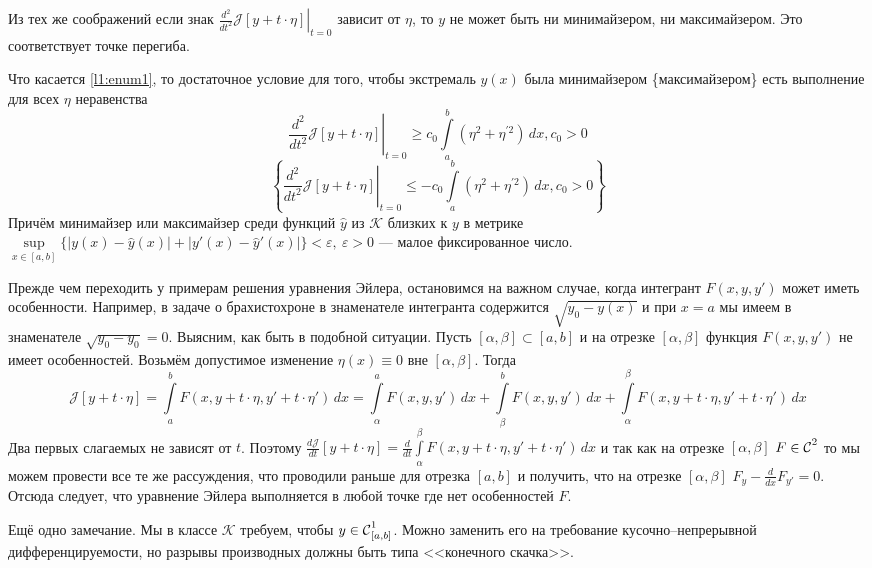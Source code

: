 \documentclass[12pt,a4paper,openany,fleqn]{book}
\newcommand{\Cf}{\ensuremath{\mathcal{C}}}
\newcommand{\J}{\ensuremath{\mathcal{J}}}
\newcommand{\mc}[1]{\ensuremath{\mathcal{#1}}}
\newcommand{\Cfn}[2][]{\ensuremath{\Cf{\mathstrut}^{#2}_{#1}}}
\newcommand{\der}[2]{\ensuremath{\frac{d#1}{d#2}}}
\newcommand{\dder}[2]{\ensuremath{\frac{d^2#1}{d#2^2}}}
\theoremstyle{definition}
\begin{document}
	Из тех же соображений если знак $\left.\dder{}{t}\J[y+t\cdot\eta]\right|_{t=0}$ зависит от $\eta$, то $y$ не может быть ни минимайзером, ни максимайзером. Это соответствует точке перегиба.   
	
	Что касается \ref{l1:enum1}, то достаточное условие для того, чтобы экстремаль $y(x)$ была минимайзером \{максимайзером\} есть выполнение для всех $\eta$ неравенства
	\begin{equation*}
		\left.\dder{}{t}\J[y+t\cdot\eta]\right|_{t=0}\geqslant c_0\int\limits_a^b\left(\eta^2+\eta^{\prime 2}\right)\,dx, c_0>0
	\end{equation*}
\begin{equation*}
	\left\{\left.\dder{}{t}\J[y+t\cdot\eta]\right|_{t=0}\leqslant -c_0\int\limits_a^b\left(\eta^2+\eta^{\prime 2}\right)\,dx, c_0>0\right\}
\end{equation*} 
Причём минимайзер или максимайзер среди функций $\hat{y}$ из $\mc{K}$ близких к $y$ в метрике\\ $\sup\limits_{x\in{[a,b]}}\{|y(x)-\hat{y}(x)|+|y'(x)-\hat{y}'(x)|\}<\varepsilon,\ \varepsilon>0$ --- малое фиксированное число.

Прежде чем переходить у примерам решения уравнения Эйлера, остановимся на важном случае, когда интегрант $F(x,y,y')$ может иметь особенности. Например, в задаче о брахистохроне в знаменателе интегранта содержится $\sqrt{y_0-y(x)}$ и при $x=a$ мы имеем в знаменателе $\sqrt{y_0-y_0}=0$. Выясним, как быть в подобной ситуации. Пусть $[\alpha,\beta]\subset[a,b]$ и на отрезке $[\alpha,\beta]$ функция $F(x,y,y')$ не имеет особенностей. Возьмём допустимое изменение $\eta(x)\equiv0$ вне $[\alpha,\beta]$. Тогда 
\begin{equation*}
\J[y+t\cdot\eta]=\int\limits_a^b F(x,y+t\cdot\eta,y'+t\cdot\eta')\,dx=\int\limits_{\alpha}^a F(x,y,y')\,dx+\int\limits_{\beta}^b F(x,y,y')\,dx+\int\limits_{\alpha}^{\beta} F(x,y+t\cdot\eta,y'+t\cdot\eta')\,dx
\end{equation*} 
Два первых слагаемых не зависят от $t$. Поэтому $\der{\J}{t}[y+t\cdot\eta]=\der{}{t}\int\limits_{\alpha}^{\beta} F(x,y+t\cdot\eta,y'+t\cdot\eta')\,dx$ и так как на отрезке $[\alpha,\beta]$ $F\in\Cfn[]{2}$ то мы можем провести все те же рассуждения, что проводили раньше для отрезка $[a,b]$ и получить, что на отрезке $[\alpha,\beta]$ $F_y-\der{}{x}F_{y'}=0$. Отсюда следует, что уравнение Эйлера выполняется в любой точке где нет особенностей $F$. 

Ещё одно замечание. Мы в классе $\mc{K}$ требуем, чтобы $y\in\Cfn[{[a,b]}]{1}$. Можно заменить его на требование кусочно--непрерывной дифференцируемости, но разрывы производных должны быть типа <<конечного скачка>>. 
\end{document}
